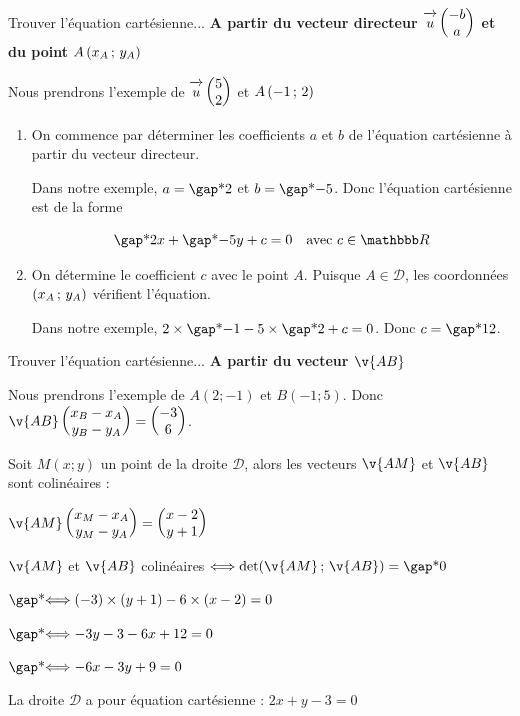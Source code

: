 \documentclass[10pt,a4paper,openany,twoside, prof]{book}
\begin{document}
\begin{methode}{Trouver l'équation cartésienne...}{}
   \textbf{A partir du vecteur directeur $\overrightarrow{\,\mathstrut u\,}\begin{pmatrix}-b\\a\end{pmatrix}$ et du point $A\left(x_A\,;\,y_A\right)$}

   \medskip
   Nous prendrons l'exemple de $\overrightarrow{\,\mathstrut u\,}\begin{pmatrix}5\\2\end{pmatrix}$ et $A\left(-1\,;\,2\right)$
   \begin{enumerate}[label=(\roman*)]
      \item On commence par déterminer les coefficients $a$ et $b$ de l'équation cartésienne à partir du vecteur directeur.

      Dans notre exemple, $a=\troum{2}$ et $b=\troum{-5}$. Donc l'équation cartésienne est de la forme

      $$\troum{2}x+\troum{-5}y+c=0 \quad\text{avec }c\in\R$$

      \item On détermine le coefficient $c$ avec le point $A$. Puisque $A\in\mathcal{D}$, les coordonnées $\left(x_A\,;\,y_A\right)$ vérifient l'équation.

      Dans notre exemple, $2\times\troum{-1}-5\times\troum{2}+c=0$. Donc $c=\troum{12}$.

   \end{enumerate}
\end{methode}
\begin{methode}{Trouver l'équation cartésienne...}{}
   \textbf{A partir du vecteur $\v{AB}$}

   \medskip
   Nous prendrons l'exemple de  $A(2;-1)$ et $B(-1;5)$. Donc $\v{AB}\coordvp{x_B-x_A}{y_B-y_A}=\coordvp{-3}{6}$.

   Soit $M(x;y)$ un point de la droite $\mathcal{D}$, alors les vecteurs $\v{AM}$ et $\v{AB}$ sont colinéaires :

   \medskip
   \hspace{5mm}$\v{AM}\coordvp{x_M-x_A}{y_M-y_A}=\coordvp{x-2}{y+1}$

   \medskip
   \noindent $\v{AM}$ et $\v{AB}$ colinéaires $\Longleftrightarrow \det{\v{AM}}{\v{AB}}=\troum{0}$

   \noindent {} $\troum{\Longleftrightarrow (-3)\times(y+1)-6\times(x-2)=0}$

   \noindent {} $\troum{\Longleftrightarrow -3y-3-6x+12=0}$

   \noindent {} $\troum{\Longleftrightarrow -6x-3y+9=0}$

   \medskip
   La droite $\mathcal{D}$ a pour équation cartésienne : $2x+y-3=0$
   \end{methode}
\end{document}
